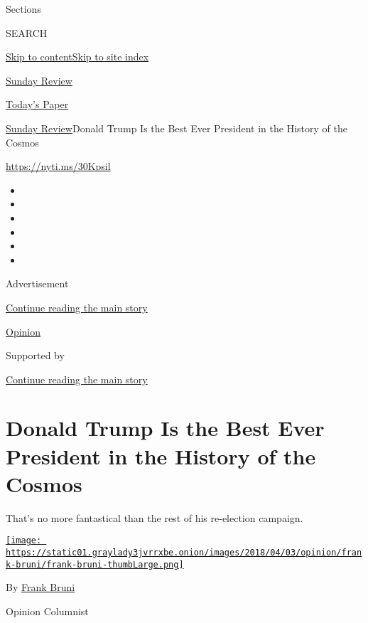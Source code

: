 Sections

SEARCH

\protect\hyperlink{site-content}{Skip to
content}\protect\hyperlink{site-index}{Skip to site index}

\href{https://www.nytimes3xbfgragh.onion/section/opinion/sunday}{Sunday
Review}

\href{https://myaccount.nytimes3xbfgragh.onion/auth/login?response_type=cookie\&client_id=vi}{}

\href{https://www.nytimes3xbfgragh.onion/section/todayspaper}{Today's
Paper}

\href{/section/opinion/sunday}{Sunday Review}\textbar{}Donald Trump Is
the Best Ever President in the History of the Cosmos

\href{https://nyti.ms/30Kpsil}{https://nyti.ms/30Kpsil}

\begin{itemize}
\item
\item
\item
\item
\item
\item
\end{itemize}

Advertisement

\protect\hyperlink{after-top}{Continue reading the main story}

\href{/section/opinion}{Opinion}

Supported by

\protect\hyperlink{after-sponsor}{Continue reading the main story}

\hypertarget{donald-trump-is-the-best-ever-president-in-the-history-of-the-cosmos}{%
\section{Donald Trump Is the Best Ever President in the History of the
Cosmos}\label{donald-trump-is-the-best-ever-president-in-the-history-of-the-cosmos}}

That's no more fantastical than the rest of his re-election campaign.

\href{https://www.nytimes3xbfgragh.onion/by/frank-bruni}{\texttt{[image: https://static01.graylady3jvrrxbe.onion/images/2018/04/03/opinion/frank-bruni/frank-bruni-thumbLarge.png]}}

By \href{https://www.nytimes3xbfgragh.onion/by/frank-bruni}{Frank Bruni}

Opinion Columnist

